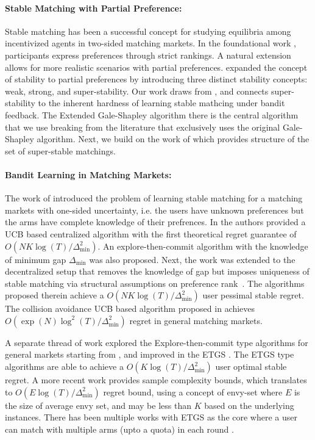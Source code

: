 \documentclass{article}
\begin{document}
\paragraph{Stable Matching with Partial Preference:} Stable matching has been a successful concept for studying equilibria among incentivized agents in two-sided matching markets. In the foundational work \cite{gale1962college}, participants express preferences through strict rankings. A natural extension allows for more realistic scenarios with partial preferences. \cite{irving1994stable} expanded the concept of stability to partial preferences by introducing three distinct stability concepts: weak, strong, and super-stability. Our work draws from \cite{irving1994stable}, and connects super-stability to the inherent hardness of learning stable mathcing under bandit feedback. The Extended Gale-Shapley algorithm there is the central algorithm that we use breaking from the literature that exclusively uses the original Gale-Shapley algorithm. Next, we build on the work of \cite{spieker1995set} which provides structure of the set of super-stable matchings. 
\paragraph{Bandit Learning in Matching Markets:} The work of \cite{das2005two} introduced the problem of learning stable matching for a matching markets with one-sided uncertainty, i.e. the users have unknown preferences but the arms have complete knowledge of their prefrences. In \cite{liu_centralized_2020} the authors provided a UCB based centralized algorithm with the first theoretical regret guarantee of $O(NK\log(T)/ \Delta_{\min}^2)$. An explore-then-commit algorithm with the knowledge of minimum gap $\Delta_{\min}$ was also proposed. Next, the work was extended to the decentralized setup that removes the knowledge of gap but imposes uniqueness of stable matching via structural assumptions on preference rank~\cite{ucbd3, basu_2021, maheshwari_2022}. The algorithms proposed therein achieve a $O(NK\log(T)/ \Delta_{\min}^2)$ user pessimal stable regret. The collision avoidance UCB based algorithm proposed in \cite{liu_decentralized_2021} achieves $O(\exp(N)\log^2(T)/ \Delta_{\min}^2)$ regret in general matching markets. 

A separate thread of work explored the Explore-then-commit type algorithms for general markets starting from \cite{basu_2021}, and improved in the ETGS \cite{kong2023playeroptimal}. The ETGS type algorithms are able to achieve a $O(K\log(T)/ \Delta_{\min}^2)$ user optimal stable regret. A more recent work \cite{hosseini2024putting} provides sample complexity bounds, which translates to $O(E\log(T)/ \Delta_{\min}^2)$ regret bound, using a concept of envy-set where $E$ is the size of average envy set, and may be less than $K$ based on the underlying instances. There has been multiple works with ETGS as the core where a user can match with multiple arms (upto a quota) in each round \cite{kong2024improved, saha2024altruistic}. 
\end{document}
